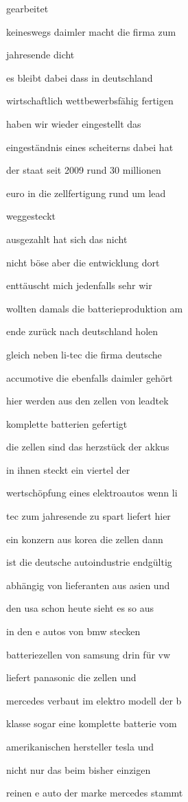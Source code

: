 \documentclass[a4paper, 11pt]{book} %
\begin{document}
gearbeitet

keineswegs daimler macht die firma zum

jahresende dicht

es bleibt dabei dass in deutschland

wirtschaftlich wettbewerbsfähig fertigen

haben wir wieder eingestellt das

eingeständnis eines scheiterns dabei hat

der staat seit 2009 rund 30 millionen

euro in die zellfertigung rund um lead

weggesteckt

ausgezahlt hat sich das nicht

nicht böse aber die entwicklung dort

enttäuscht mich jedenfalls sehr wir

wollten damals die batterieproduktion am

ende zurück nach deutschland holen

gleich neben li-tec die firma deutsche

accumotive die ebenfalls daimler gehört

hier werden aus den zellen von leadtek

komplette batterien gefertigt

die zellen sind das herzstück der akkus

in ihnen steckt ein viertel der

wertschöpfung eines elektroautos wenn li

tec zum jahresende zu spart liefert hier

ein konzern aus korea die zellen dann

ist die deutsche autoindustrie endgültig

abhängig von lieferanten aus asien und

den usa schon heute sieht es so aus

in den e autos von bmw stecken

batteriezellen von samsung drin für vw

liefert panasonic die zellen und

mercedes verbaut im elektro modell der b

klasse sogar eine komplette batterie vom

amerikanischen hersteller tesla und

nicht nur das beim bisher einzigen

reinen e auto der marke mercedes stammt
\end{document}
